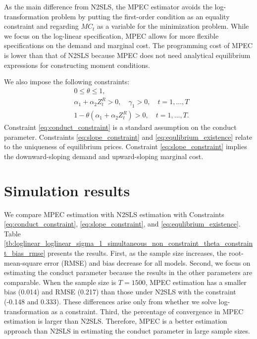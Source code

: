 \documentclass[11pt, a4paper]{article}
\begin{document}
As the main difference from N2SLS, the MPEC estimator avoids the log-transformation problem by putting the first-order condition as an equality constraint and regarding $MC_t$ as a variable for the minimization problem.
While we focus on the log-linear specification, MPEC allows for more flexible specifications on the demand and marginal cost.
The programming cost of MPEC is lower than that of N2SLS because MPEC does not need analytical equilibrium expressions for constructing moment conditions.

We also impose the following constraints:
\begin{align}
    &0\le\theta \le 1,\label{eq:conduct_constraint}\\
    &\alpha_1 + \alpha_2 Z_{t}^{R} >0, \quad \gamma_1>0 ,\quad t = 1,\ldots, T\label{eq:slope_constraint}\\
    &1- \theta(\alpha_1 + \alpha_2 Z_{t}^{R}) >0,\quad t = 1,\ldots, T.\label{eq:equlibrium_existence}
\end{align}
Constraint \eqref{eq:conduct_constraint} is a standard assumption on the conduct parameter.
Constraints \eqref{eq:slope_constraint} and \eqref{eq:equlibrium_existence} relate to the uniqueness of equilibrium prices. 
Constraint \eqref{eq:slope_constraint} implies the downward-sloping demand and upward-sloping marginal cost.








\section{Simulation results}\label{sec:results}

We compare MPEC estimation with N2SLS estimation with Constraints \eqref{eq:conduct_constraint}, \eqref{eq:slope_constraint}, and \eqref{eq:equlibrium_existence}.
Table \ref{tb:loglinear_loglinear_sigma_1_simultaneous_non_constraint_theta_constraint_bias_rmse} presents the results.
First, as the sample size increases, the root-mean-square error (RMSE) and bias decrease for all models. 
Second, we focus on estimating the conduct parameter because the results in the other parameters are comparable.
When the sample size is $T=1500$, MPEC estimation has a smaller bias (0.014) and RMSE (0.217) than those under N2SLS with the constraint (-0.148 and 0.333).
These differences arise only from whether we solve log-transformation as a constraint.
Third, the percentage of convergence in MPEC estimation is larger than N2SLS. 
Therefore, MPEC is a better estimation approach than N2SLS in estimating the conduct parameter in large sample sizes.
\end{document}
